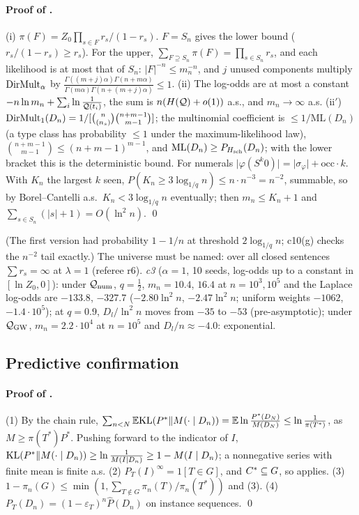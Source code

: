 \paragraph{Proof of .} (i) $\pi(F)=Z_0\prod_{s\in F}r_s/(1-r_s)$. $F=S_n$ gives the lower bound ($r_s/(1-r_s)\ge r_s$). For the upper, $\sum_{F\supseteq S_n}\pi(F)=\prod_{s\in S_n}r_s$, and each likelihood is at most that of $S_n$: $\lvert F\rvert^{-n}\le m_n^{-n}$, and $j$ unused components multiply $\mathrm{DirMult}_\alpha$ by $\frac{\Gamma((m+j)\alpha)\Gamma(n+m\alpha)}{\Gamma(m\alpha)\Gamma(n+(m+j)\alpha)}\le1$. (ii) The log-odds are at most a constant $-n\ln m_n+\sum_i\ln\frac1{\mathcal{Q}(t_i)}$, the sum is $n(H(\mathcal{Q})+o(1))$ a.s., and $m_n\to\infty$ a.s. (ii$'$) $\mathrm{DirMult}_1(D_n)=1/[\binom n{(n_s)}\binom{n+m-1}{m-1}]$; the multinomial coefficient is $\le1/\mathrm{ML}(D_n)$ (a type class has probability $\le1$ under the maximum-likelihood law), $\binom{n+m-1}{m-1}\le(n+m-1)^{m-1}$, and $\mathrm{ML}(D_n)\ge P_{H_{\mathrm{sch}}}(D_n)$; with the lower bracket this is the deterministic bound. For numerals $\lvert\varphi(S^k0)\rvert=\lvert\sigma_\varphi\rvert+\mathrm{occ}\cdot k$. With $K_n$ the largest $k$ seen, $P(K_n\ge3\log_{1/q}n)\le n\cdot n^{-3}=n^{-2}$, summable, so by Borel--Cantelli a.s.\ $K_n<3\log_{1/q}n$ eventually; then $m_n\le K_n+1$ and $\sum_{s\in S_n}(\lvert s\rvert+1)=O(\ln^2n)$. \qed

(The first version had probability $1-1/n$ at threshold $2\log_{1/q}n$; c10(g) checks the $n^{-2}$ tail exactly.) The universe must be named: over all closed sentences $\sum r_s=\infty$ at $\lambda=1$ (referee r6). \emph{c3} ($\alpha=1$, 10 seeds, log-odds up to a constant in $[\ln Z_0,0]$): under $\mathcal{Q}_{\mathrm{num}}$, $q=\tfrac12$, $m_n=10.4$, $16.4$ at $n=10^3,10^5$ and the Laplace log-odds are $-133.8$, $-327.7$ ($-2.80\ln^2n$, $-2.47\ln^2n$; uniform weights $-1062$, $-1.4\cdot10^5$); at $q=0.9$, $D_l/\ln^2n$ moves from $-35$ to $-53$ (pre-asymptotic); under $\mathcal{Q}_{\mathrm{GW}}$, $m_n=2.2\cdot10^4$ at $n=10^5$ and $D_l/n\approx-4.0$: exponential.

\subsection{Predictive confirmation}\label{app:univ:confirm}

\paragraph{Proof of .} (1) By the chain rule, $\sum_{n<N}\mathbb{E}\mathrm{KL}(P^*\|M(\cdot\mid D_n))=\mathbb{E}\ln\frac{P^*(D_N)}{M(D_N)}\le\ln\frac1{\pi(T^*)}$, as $M\ge\pi(T^*)P^*$. Pushing forward to the indicator of $I$, $\mathrm{KL}(P^*\|M(\cdot\mid D_n))\ge\ln\frac1{M(I\mid D_n)}\ge1-M(I\mid D_n)$; a nonnegative series with finite mean is finite a.s. (2) $P_T(I)^\infty=1[T\in G]$, and $C^{*}\subseteq G$, so  applies. (3) $1-\pi_n(G)\le\min(1,\sum_{T\notin G}\pi_n(T)/\pi_n(T^*))$ and (3). (4) $P_T(D_n)=(1-\varepsilon_T)^n\hat P(D_n)$ on instance sequences. \qed

